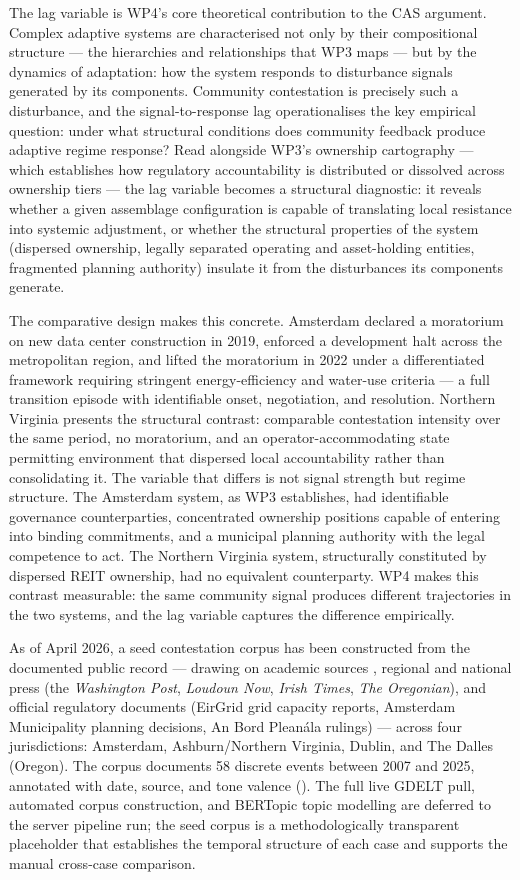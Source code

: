 The lag variable is WP4's core theoretical contribution to the CAS argument. Complex adaptive systems are characterised not only by their compositional structure — the hierarchies and relationships that WP3 maps — but by the dynamics of adaptation: how the system responds to disturbance signals generated by its components. Community contestation is precisely such a disturbance, and the signal-to-response lag operationalises the key empirical question: under what structural conditions does community feedback produce adaptive regime response? Read alongside WP3's ownership cartography — which establishes how regulatory accountability is distributed or dissolved across ownership tiers — the lag variable becomes a structural diagnostic: it reveals whether a given assemblage configuration is capable of translating local resistance into systemic adjustment, or whether the structural properties of the system (dispersed ownership, legally separated operating and asset-holding entities, fragmented planning authority) insulate it from the disturbances its components generate.

The comparative design makes this concrete. Amsterdam declared a moratorium on new data center construction in 2019, enforced a development halt across the metropolitan region, and lifted the moratorium in 2022 under a differentiated framework requiring stringent energy-efficiency and water-use criteria — a full transition episode with identifiable onset, negotiation, and resolution. Northern Virginia presents the structural contrast: comparable contestation intensity over the same period, no moratorium, and an operator-accommodating state permitting environment that dispersed local accountability rather than consolidating it. The variable that differs is not signal strength but regime structure. The Amsterdam system, as WP3 establishes, had identifiable governance counterparties, concentrated ownership positions capable of entering into binding commitments, and a municipal planning authority with the legal competence to act. The Northern Virginia system, structurally constituted by dispersed REIT ownership, had no equivalent counterparty. WP4 makes this contrast measurable: the same community signal produces different trajectories in the two systems, and the lag variable captures the difference empirically.

As of April 2026, a seed contestation corpus has been constructed from the documented public record — drawing on academic sources \citep{vonderau2019storing}, regional and national press (the \textit{Washington Post}, \textit{Loudoun Now}, \textit{Irish Times}, \textit{The Oregonian}), and official regulatory documents (EirGrid grid capacity reports, Amsterdam Municipality planning decisions, An Bord Pleanála rulings) — across four jurisdictions: Amsterdam, Ashburn/Northern Virginia, Dublin, and The Dalles (Oregon). The corpus documents 58 discrete events between 2007 and 2025, annotated with date, source, and tone valence (). The full live GDELT pull, automated corpus construction, and BERTopic topic modelling are deferred to the server pipeline run; the seed corpus is a methodologically transparent placeholder that establishes the temporal structure of each case and supports the manual cross-case comparison.

